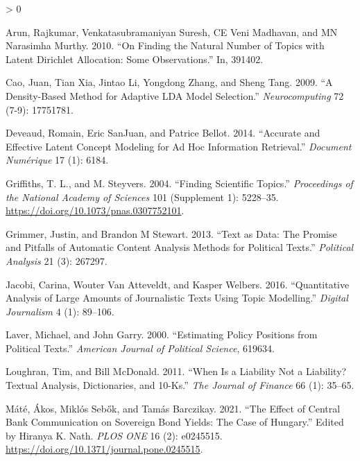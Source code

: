 \documentclass[
]{book}
\newlength{\cslhangindent}
\newenvironment{CSLReferences}[2] %
 {%
  \setlength{\parindent}{0pt}
  \ifodd #1 \everypar{\setlength{\hangindent}{\cslhangindent}}\ignorespaces\fi
  \ifnum #2 > 0
  \setlength{\parskip}{#2\baselineskip}
  \fi
 }%
 {}
\begin{document}
\hypertarget{refs}{}
\begin{CSLReferences}{1}{0}
\leavevmode\hypertarget{ref-arun2010finding}{}%
Arun, Rajkumar, Venkatasubramaniyan Suresh, CE Veni Madhavan, and MN
Narasimha Murthy. 2010. {``On Finding the Natural Number of Topics with
Latent Dirichlet Allocation: Some Observations.''} In, 391402.

\leavevmode\hypertarget{ref-cao2009density}{}%
Cao, Juan, Tian Xia, Jintao Li, Yongdong Zhang, and Sheng Tang. 2009.
{``A Density-Based Method for Adaptive LDA Model Selection.''}
\emph{Neurocomputing} 72 (7-9): 17751781.

\leavevmode\hypertarget{ref-deveaud2014accurate}{}%
Deveaud, Romain, Eric SanJuan, and Patrice Bellot. 2014. {``Accurate and
Effective Latent Concept Modeling for Ad Hoc Information Retrieval.''}
\emph{Document Numérique} 17 (1): 6184.

\leavevmode\hypertarget{ref-griffiths2004}{}%
Griffiths, T. L., and M. Steyvers. 2004. {``Finding Scientific
Topics.''} \emph{Proceedings of the National Academy of Sciences} 101
(Supplement 1): 5228--35. \url{https://doi.org/10.1073/pnas.0307752101}.

\leavevmode\hypertarget{ref-grimmer2013text}{}%
Grimmer, Justin, and Brandon M Stewart. 2013. {``Text as Data: The
Promise and Pitfalls of Automatic Content Analysis Methods for Political
Texts.''} \emph{Political Analysis} 21 (3): 267297.

\leavevmode\hypertarget{ref-jacobi2016}{}%
Jacobi, Carina, Wouter Van Atteveldt, and Kasper Welbers. 2016.
{``Quantitative Analysis of Large Amounts of Journalistic Texts Using
Topic Modelling.''} \emph{Digital Journalism} 4 (1): 89--106.

\leavevmode\hypertarget{ref-laver2000estimating}{}%
Laver, Michael, and John Garry. 2000. {``Estimating Policy Positions
from Political Texts.''} \emph{American Journal of Political Science},
619634.

\leavevmode\hypertarget{ref-loughran2011}{}%
Loughran, Tim, and Bill McDonald. 2011. {``When Is a Liability Not a
Liability? Textual Analysis, Dictionaries, and 10-Ks.''} \emph{The
Journal of Finance} 66 (1): 35--65.

\leavevmode\hypertarget{ref-muxe1tuxe92021}{}%
Máté, Ákos, Miklós Sebők, and Tamás Barczikay. 2021. {``The Effect of
Central Bank Communication on Sovereign Bond Yields: The Case of
Hungary.''} Edited by Hiranya K. Nath. \emph{PLOS ONE} 16 (2): e0245515.
\url{https://doi.org/10.1371/journal.pone.0245515}.


\end{CSLReferences}
\end{document}
